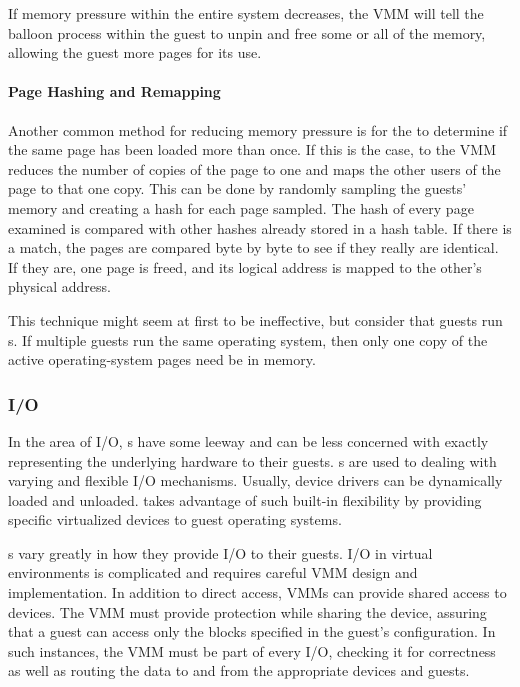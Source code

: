 If memory pressure within the entire system decreases, the VMM will tell the balloon process within the guest to unpin and free some or all of the memory, allowing the guest more pages for its use.

\paragraph{Page Hashing and Remapping}\label{par:Hash_VMem_Remap}
Another common method for reducing memory pressure is for the  to determine if the same page has been loaded more than once.
If this is the case, to the VMM reduces the number of copies of the page to one and maps the other users of the page to that one copy.
This can be done by randomly sampling the guests' memory and creating a hash for each page sampled.
The hash of every page examined is compared with other hashes already stored in a hash table.
If there is a match, the pages are compared byte by byte to see if they really are identical.
If they are, one page is freed, and its logical address is mapped to the other’s physical address.

This technique might seem at first to be ineffective, but consider that guests run s.
If multiple guests run the same operating system, then only one copy of the active operating-system pages need be in memory.

\subsubsection{I/O}\label{subsubsec:VM_I/O}
In the area of I/O, s have some leeway and can be less concerned with exactly representing the underlying hardware to their guests.
s are used to dealing with varying and flexible I/O mechanisms.
Usually, device drivers can be dynamically loaded and unloaded.
 takes advantage of such built-in flexibility by providing specific virtualized devices to guest operating systems.

s vary greatly in how they provide I/O to their guests.
I/O in virtual environments is complicated and requires careful VMM design and implementation.
In addition to direct access, VMMs can provide shared access to devices.
The VMM must provide protection while sharing the device, assuring that a guest can access only the blocks specified in the guest’s configuration.
In such instances, the VMM must be part of every I/O, checking it for correctness as well as routing the data to and from the appropriate devices and guests.

